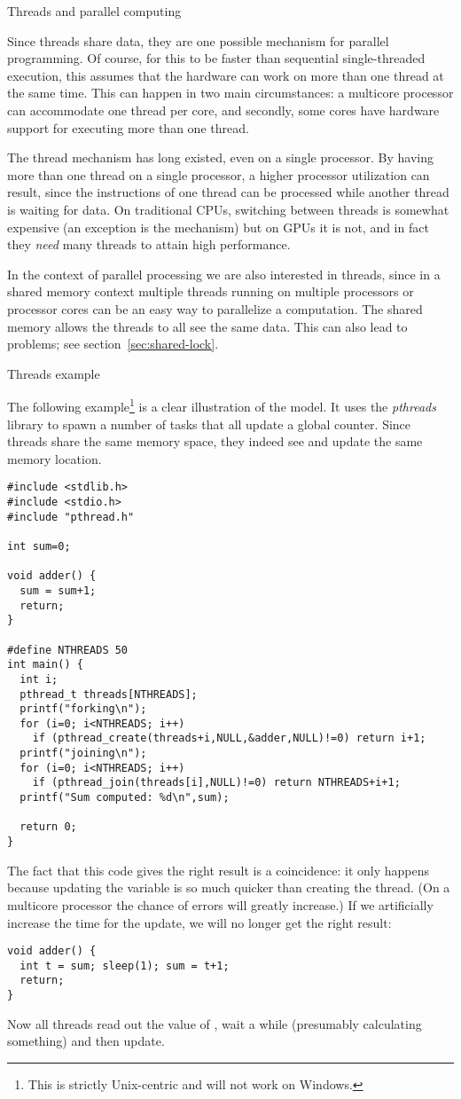  {Threads and parallel computing}

Since threads share data, they are one possible mechanism for parallel programming.
Of course, for this to be faster than sequential single-threaded execution,
this assumes that the hardware can work on more than one
thread at the same time. This can happen in two main circumstances:
a multicore processor can accommodate one thread per core,
and secondly, some cores have hardware support for executing more
than one thread.

The thread mechanism has long existed, even on a single processor. By having more
than one thread on a single processor, a higher processor utilization
can result, since the instructions of one thread can be processed
while another thread is waiting for data.  On traditional CPUs,
switching between threads is somewhat expensive (an exception is the
 mechanism) but on \acp{GPU} it is not, and
in fact they \emph{need} many threads to attain high performance.

In the context of parallel processing we are also interested in
threads, since in a shared memory context multiple threads running on
multiple processors or processor cores can be an easy way to
parallelize a computation. The shared memory allows the threads to all
see the same data. This can also lead to problems; see
section~\ref{sec:shared-lock}.

 {Threads example}
\label{sec:thread-example}

The following example\footnote{This is strictly Unix-centric and will
  not work on Windows.} is a clear illustration of the  model.
It uses the \emph{pthreads} library to spawn
a number of tasks that all update a global counter. Since threads
share the same memory space, they indeed see and update the same
memory location.
\begin{verbatim}
#include <stdlib.h>
#include <stdio.h>
#include "pthread.h"

int sum=0;

void adder() {
  sum = sum+1;
  return;
}

#define NTHREADS 50
int main() {
  int i;
  pthread_t threads[NTHREADS];
  printf("forking\n");
  for (i=0; i<NTHREADS; i++)
    if (pthread_create(threads+i,NULL,&adder,NULL)!=0) return i+1;
  printf("joining\n");
  for (i=0; i<NTHREADS; i++)
    if (pthread_join(threads[i],NULL)!=0) return NTHREADS+i+1;
  printf("Sum computed: %d\n",sum);

  return 0;
}
\end{verbatim}
The fact that this code gives the right result is a
coincidence: it
only happens because updating the variable is so much quicker than
creating the thread. (On a multicore processor the chance of errors
will greatly increase.) If we artificially increase the time for the
update, we will no longer get the right result:
\begin{verbatim}
void adder() {
  int t = sum; sleep(1); sum = t+1;
  return;
}
\end{verbatim}
Now all threads read out the value of , wait a while
(presumably calculating something) and then update.

